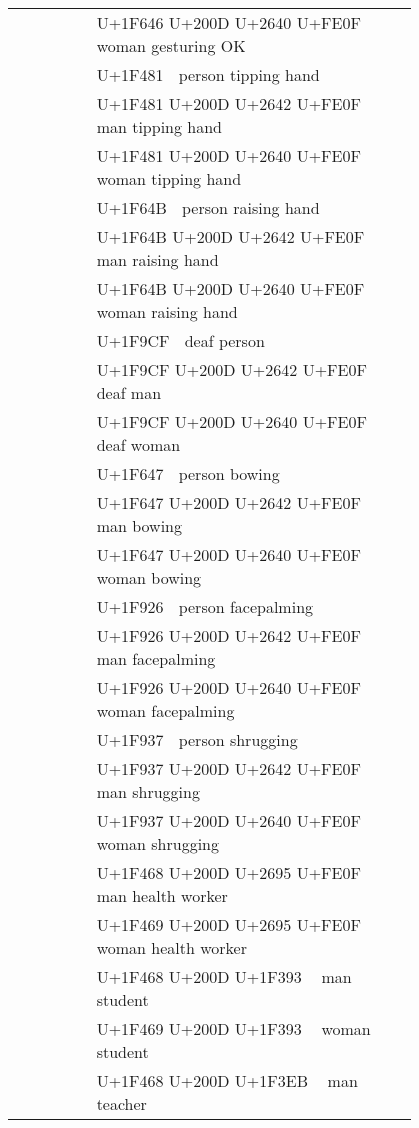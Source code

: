 \documentclass[a4paper,12pt]{ltjarticle}
\newcommand{\fontA}[1]{{\fontspec[RawFeature={mode=harf,+dist,+ccmp}]{Segoe UI Emoji} #1}}
\newcommand{\fontB}[1]{{\fontspec[RawFeature={mode=harf,+dist,+ccmp}]{Noto Color Emoji} #1}}
\begin{document}
\begin{longtable}[c]{ccp{0.8\linewidth}}
\fontA{🙆‍♀️}&\fontB{🙆‍♀️}&U+1F646 U+200D U+2640 U+FE0F 🙆‍♀️ woman gesturing OK\\
\fontA{💁}&\fontB{💁}&U+1F481 💁 person tipping hand\\
\fontA{💁‍♂️}&\fontB{💁‍♂️}&U+1F481 U+200D U+2642 U+FE0F 💁‍♂️ man tipping hand\\
\fontA{💁‍♀️}&\fontB{💁‍♀️}&U+1F481 U+200D U+2640 U+FE0F 💁‍♀️ woman tipping hand\\
\fontA{🙋}&\fontB{🙋}&U+1F64B 🙋 person raising hand\\
\fontA{🙋‍♂️}&\fontB{🙋‍♂️}&U+1F64B U+200D U+2642 U+FE0F 🙋‍♂️ man raising hand\\
\fontA{🙋‍♀️}&\fontB{🙋‍♀️}&U+1F64B U+200D U+2640 U+FE0F 🙋‍♀️ woman raising hand\\
\fontA{🧏}&\fontB{🧏}&U+1F9CF 🧏 deaf person\\
\fontA{🧏‍♂️}&\fontB{🧏‍♂️}&U+1F9CF U+200D U+2642 U+FE0F 🧏‍♂️ deaf man\\
\fontA{🧏‍♀️}&\fontB{🧏‍♀️}&U+1F9CF U+200D U+2640 U+FE0F 🧏‍♀️ deaf woman\\
\fontA{🙇}&\fontB{🙇}&U+1F647 🙇 person bowing\\
\fontA{🙇‍♂️}&\fontB{🙇‍♂️}&U+1F647 U+200D U+2642 U+FE0F 🙇‍♂️ man bowing\\
\fontA{🙇‍♀️}&\fontB{🙇‍♀️}&U+1F647 U+200D U+2640 U+FE0F 🙇‍♀️ woman bowing\\
\fontA{🤦}&\fontB{🤦}&U+1F926 🤦 person facepalming\\
\fontA{🤦‍♂️}&\fontB{🤦‍♂️}&U+1F926 U+200D U+2642 U+FE0F 🤦‍♂️ man facepalming\\
\fontA{🤦‍♀️}&\fontB{🤦‍♀️}&U+1F926 U+200D U+2640 U+FE0F 🤦‍♀️ woman facepalming\\
\fontA{🤷}&\fontB{🤷}&U+1F937 🤷 person shrugging\\
\fontA{🤷‍♂️}&\fontB{🤷‍♂️}&U+1F937 U+200D U+2642 U+FE0F 🤷‍♂️ man shrugging\\
\fontA{🤷‍♀️}&\fontB{🤷‍♀️}&U+1F937 U+200D U+2640 U+FE0F 🤷‍♀️ woman shrugging\\
\fontA{👨‍⚕️}&\fontB{👨‍⚕️}&U+1F468 U+200D U+2695 U+FE0F 👨‍⚕️ man health worker\\
\fontA{👩‍⚕️}&\fontB{👩‍⚕️}&U+1F469 U+200D U+2695 U+FE0F 👩‍⚕️ woman health worker\\
\fontA{👨‍🎓}&\fontB{👨‍🎓}&U+1F468 U+200D U+1F393 👨‍🎓 man student\\
\fontA{👩‍🎓}&\fontB{👩‍🎓}&U+1F469 U+200D U+1F393 👩‍🎓 woman student\\
\fontA{👨‍🏫}&\fontB{👨‍🏫}&U+1F468 U+200D U+1F3EB 👨‍🏫 man teacher\\

\end{longtable}
\end{document}
